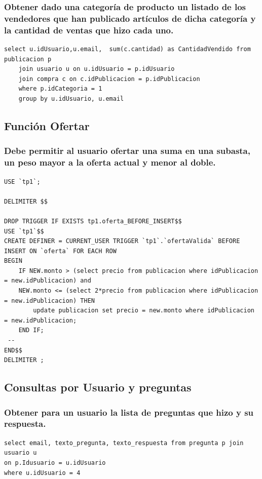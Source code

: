 \documentclass[a4paper, 10pt, twoside]{article}
\begin{document}
\subsubsection{Obtener dado una categor\'ia de producto un listado de los vendedores que han publicado art\'iculos de dicha categor\'ia y la cantidad de ventas que hizo cada uno.
}
\begin{verbatim}
select u.idUsuario,u.email,  sum(c.cantidad) as CantidadVendido from publicacion p 
	join usuario u on u.idUsuario = p.idUsuario
    join compra c on c.idPublicacion = p.idPublicacion
	where p.idCategoria = 1
    group by u.idUsuario, u.email
\end{verbatim}

\subsection{Funci\'on Ofertar}
\subsubsection{Debe permitir al usuario ofertar una suma en una subasta, un peso mayor a la oferta actual y menor al doble. }

\begin{verbatim}
USE `tp1`;

DELIMITER $$

DROP TRIGGER IF EXISTS tp1.oferta_BEFORE_INSERT$$
USE `tp1`$$
CREATE DEFINER = CURRENT_USER TRIGGER `tp1`.`ofertaValida` BEFORE INSERT ON `oferta` FOR EACH ROW
BEGIN
	IF NEW.monto > (select precio from publicacion where idPublicacion = new.idPublicacion) and 
	NEW.monto <= (select 2*precio from publicacion where idPublicacion = new.idPublicacion) THEN
		update publicacion set precio = new.monto where idPublicacion = new.idPublicacion;
	END IF;
 -- 
END$$
DELIMITER ;

\end{verbatim}
\subsection{Consultas por Usuario y preguntas}
\subsubsection{Obtener para un usuario la lista de preguntas que hizo y su respuesta.}
\begin{verbatim}
select email, texto_pregunta, texto_respuesta from pregunta p join usuario u 
on p.Idusuario = u.idUsuario 
where u.idUsuario = 4
\end{verbatim}
\end{document}
